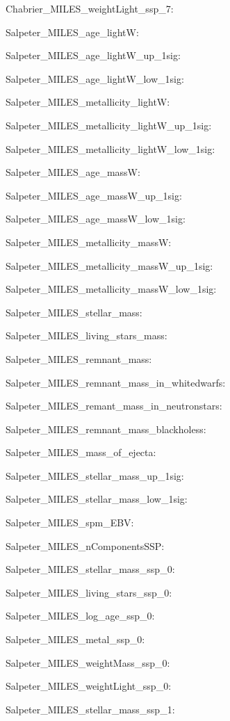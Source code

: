 \item Chabrier\_MILES\_weightLight\_ssp\_7: 
\item Salpeter\_MILES\_age\_lightW: 
\item Salpeter\_MILES\_age\_lightW\_up\_1sig: 
\item Salpeter\_MILES\_age\_lightW\_low\_1sig: 
\item Salpeter\_MILES\_metallicity\_lightW: 
\item Salpeter\_MILES\_metallicity\_lightW\_up\_1sig: 
\item Salpeter\_MILES\_metallicity\_lightW\_low\_1sig: 
\item Salpeter\_MILES\_age\_massW: 
\item Salpeter\_MILES\_age\_massW\_up\_1sig: 
\item Salpeter\_MILES\_age\_massW\_low\_1sig: 
\item Salpeter\_MILES\_metallicity\_massW: 
\item Salpeter\_MILES\_metallicity\_massW\_up\_1sig: 
\item Salpeter\_MILES\_metallicity\_massW\_low\_1sig: 
\item Salpeter\_MILES\_stellar\_mass: 
\item Salpeter\_MILES\_living\_stars\_mass: 
\item Salpeter\_MILES\_remnant\_mass: 
\item Salpeter\_MILES\_remnant\_mass\_in\_whitedwarfs: 
\item Salpeter\_MILES\_remant\_mass\_in\_neutronstars: 
\item Salpeter\_MILES\_remnant\_mass\_blackholess: 
\item Salpeter\_MILES\_mass\_of\_ejecta: 
\item Salpeter\_MILES\_stellar\_mass\_up\_1sig: 
\item Salpeter\_MILES\_stellar\_mass\_low\_1sig: 
\item Salpeter\_MILES\_spm\_EBV: 
\item Salpeter\_MILES\_nComponentsSSP: 
\item Salpeter\_MILES\_stellar\_mass\_ssp\_0: 
\item Salpeter\_MILES\_living\_stars\_ssp\_0: 
\item Salpeter\_MILES\_log\_age\_ssp\_0: 
\item Salpeter\_MILES\_metal\_ssp\_0: 
\item Salpeter\_MILES\_weightMass\_ssp\_0: 
\item Salpeter\_MILES\_weightLight\_ssp\_0: 
\item Salpeter\_MILES\_stellar\_mass\_ssp\_1: 

